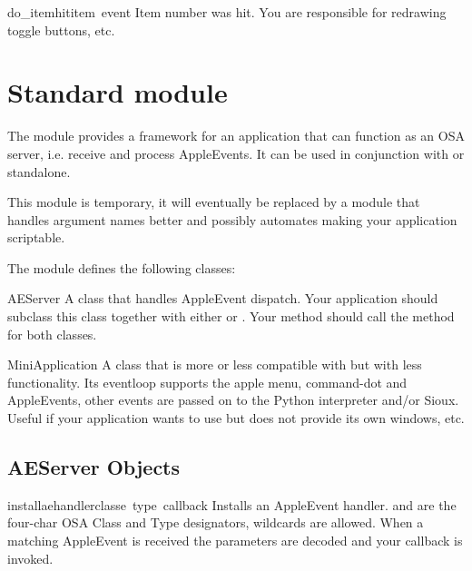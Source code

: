 \begin{funcdesc}{do_itemhit}{item\, event}
Item number  was hit. You are responsible for redrawing
toggle buttons, etc.
\end{funcdesc}

\section{Standard module }

The module  provides a framework for an application
that can function as an OSA server, i.e. receive and process
AppleEvents. It can be used in conjunction with  or
standalone.

This module is temporary, it will eventually be replaced by a module
that handles argument names better and possibly automates making your
application scriptable.

The  module defines the following classes:

\renewcommand{\indexsubitem}{(in module MiniAEFrame)}

\begin{funcdesc}{AEServer}{}
A class that handles AppleEvent dispatch. Your application should
subclass this class together with either
 or
. Your  method should call
the  method for both classes.
\end{funcdesc}

\begin{funcdesc}{MiniApplication}{}
A class that is more or less compatible with
 but with less functionality. Its
eventloop supports the apple menu, command-dot and AppleEvents, other
events are passed on to the Python interpreter and/or Sioux.
Useful if your application wants to use  but does not
provide its own windows, etc.
\end{funcdesc}

\subsection{AEServer Objects}

\renewcommand{\indexsubitem}{(AEServer method)}

\begin{funcdesc}{installaehandler}{classe\, type\, callback}
Installs an AppleEvent handler.  and  are the
four-char OSA Class and Type designators,  wildcards are
allowed. When a matching AppleEvent is received the parameters are
decoded and your callback is invoked.
\end{funcdesc}

